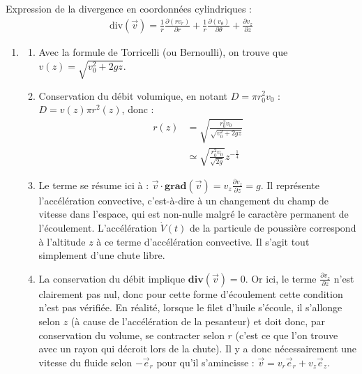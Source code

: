 Expression de la divergence en coordonnées cylindriques :
\begin{align*}
	\mathrm{div}(\vec{v})=\frac{1}{r}\frac{\partial(rv_r)}{\partial r}+\frac{1}{r}\frac{\partial(v_\theta)}{\partial \theta}+\frac{\partial v_z}{\partial z}
\end{align*}
\newpage

\begin{correction}

\begin{enumerate}

\item

\begin{enumerate}

	\item Avec la formule de Torricelli (ou Bernoulli), on trouve que $v(z)=\sqrt{v_0^2+2gz}$.
	
	\item Conservation du débit volumique, en notant $D=\pi r_0^2v_0$ : $D= v(z)\pi r^2(z)$, donc :
	\begin{align*}
		r(z)&=\sqrt{\frac{r_0^2v_0}{\sqrt{v_0^2+2gz}}}\\
		&\simeq\sqrt{\frac{r_0^2v_0}{\sqrt{2g}}}z^{-\frac{1}{4}}
	\end{align*}
	
	\item Le terme se résume ici à : $\vec{v}\cdot\mathbf{grad}(\vec{v})=v_z\frac{\partial v_z}{\partial z}=g$. Il représente l'accélération convective, c'est-à-dire à un changement du champ de vitesse dans l'espace, qui est non-nulle malgré le caractère permanent de l'écoulement. L'accélération $\dot{V}(t)$ de la particule de poussière correspond à l'altitude $z$ à ce terme d'accélération convective. Il s'agit tout simplement d'une chute libre.
	
	\item La conservation du débit implique $\mathbf{div}(\vec{v})=0$. Or ici, le terme $\frac{\partial v_z}{\partial z}$ n'est clairement pas nul, donc pour cette forme d'écoulement cette condition n'est pas vérifiée. En réalité, lorsque le filet d'huile s'écoule, il s'allonge selon $z$ (à cause de l'accélération de la pesanteur) et doit donc, par conservation du volume, se contracter selon $r$ (c'est ce que l'on trouve avec un rayon qui décroit lors de la chute). Il y a donc nécessairement une vitesse du fluide selon $-\vec{e}_r$ pour qu'il s'amincisse : $\vec{v}=v_r\vec{e}_r + v_z\vec{e}_z$.
	

\end{enumerate}
\end{enumerate}
\end{correction}
